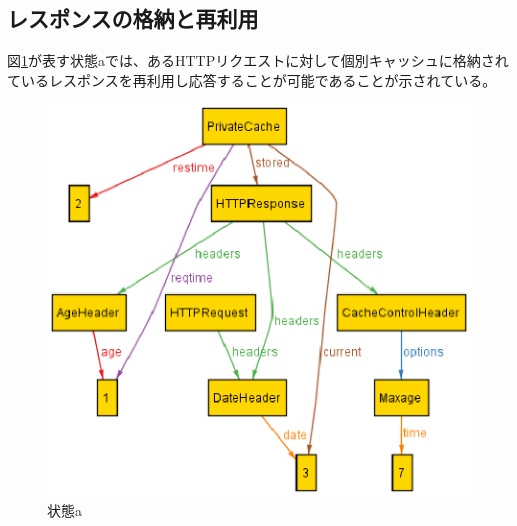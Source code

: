 \documentclass{css}
\begin{document}
\subsection{レスポンスの格納と再利用}
図\ref{fig:case1}が表す状態aでは、あるHTTPリクエストに対して個別キャッシュに格納されているレスポンスを再利用し応答することが可能であることが示されている。

\begin{figure}[htb]
\centering
\includegraphics[width=1.0\hsize]{case1.eps}
\caption{状態a}
\label{fig:case1}
\end{figure}
\end{document}
